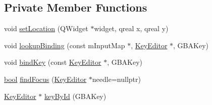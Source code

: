 \subsection*{Private Member Functions}
\begin{DoxyCompactItemize}
\item 
void \mbox{\hyperlink{class_q_g_b_a_1_1_g_b_a_key_editor_af41d655d8129ab4991fbb4b131705658}{set\+Location}} (Q\+Widget $\ast$widget, qreal x, qreal y)
\item 
void \mbox{\hyperlink{class_q_g_b_a_1_1_g_b_a_key_editor_a4f0fd55f1a17e0c7bde4a82d244602ce}{lookup\+Binding}} (const m\+Input\+Map $\ast$, \mbox{\hyperlink{class_q_g_b_a_1_1_key_editor}{Key\+Editor}} $\ast$, G\+B\+A\+Key)
\item 
void \mbox{\hyperlink{class_q_g_b_a_1_1_g_b_a_key_editor_a7cba79624d45ce9284f6675447504e9a}{bind\+Key}} (const \mbox{\hyperlink{class_q_g_b_a_1_1_key_editor}{Key\+Editor}} $\ast$, G\+B\+A\+Key)
\item 
\mbox{\hyperlink{libretro_8h_a4a26dcae73fb7e1528214a068aca317e}{bool}} \mbox{\hyperlink{class_q_g_b_a_1_1_g_b_a_key_editor_abc7a8e241516e8da699fd9c084bfdf61}{find\+Focus}} (\mbox{\hyperlink{class_q_g_b_a_1_1_key_editor}{Key\+Editor}} $\ast$needle=nullptr)
\item 
\mbox{\hyperlink{class_q_g_b_a_1_1_key_editor}{Key\+Editor}} $\ast$ \mbox{\hyperlink{class_q_g_b_a_1_1_g_b_a_key_editor_a573e977aeb5d6ef748e6dcd38618cc76}{key\+By\+Id}} (G\+B\+A\+Key)
\end{DoxyCompactItemize}
